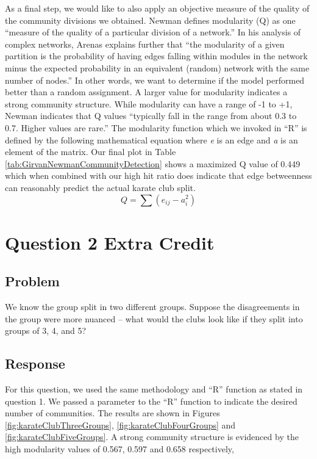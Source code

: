 \documentclass[letterpaper,11pt]{report}
\begin{document}
\begin{savenotes}
As a final step, we would like to also apply an objective measure of the quality of the community divisions we obtained.  Newman \cite{newman2004finding} defines modularity (Q) as one ``measure of the quality of a particular division of a network.'' In his analysis of complex networks, Arenas \cite{arenas2008analysis} explains further that ``the modularity of a given partition is the probability of having edges falling within modules in the network minus the expected probability in an equivalent (random) network with the same number of nodes.'' In other words, we want to determine if the model performed better than a random assignment. A larger value for modularity indicates a strong community structure. While modularity can have a range of -1 to +1, Newman \cite{newman2004finding} indicates that Q values ``typically fall in the range from about 0.3 to 0.7.  Higher values are rare.'' The modularity function which we invoked in ``R'' is defined by the following mathematical equation where \emph{e} is an edge and \emph{a} is an element of the matrix. Our final plot in Table \ref{tab:GirvanNewmanCommunityDetection} shows a maximized Q value of 0.449 which when combined with our high hit ratio does indicate that edge betweenness can reasonably predict the actual karate club split.
\begin{equation}
Q = \sum (e_{ij} - a^{2}_{i}) 
\end{equation}

\section{Question 2 Extra Credit}
\subsection{Problem}We know the group split in two different groups.  Suppose the disagreements in the group were more nuanced -- what would the clubs look like if they split into groups of 3, 4, and 5?
\subsection{Response}For this question, we used the same methodology and ``R'' function as stated in question 1. We passed a parameter to the ``R'' function to indicate the desired number of communities.  The results are shown in Figures \ref{fig:karateClubThreeGroups}, \ref{fig:karateClubFourGroups} and \ref{fig:karateClubFiveGroups}. A strong community structure is evidenced by the high modularity values of 0.567, 0.597 and 0.658 respectively,


\end{savenotes}
\end{document}
